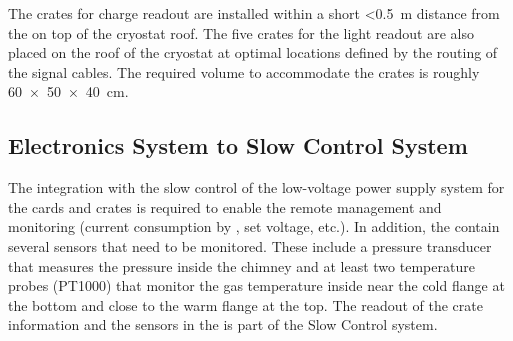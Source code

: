 The  crates for charge readout are installed within a short \SI{<0.5}{\meter} distance from the  on top of the cryostat roof. The five  crates for the light readout are also placed on the roof of the cryostat at optimal locations defined by the routing of the  signal cables. The required volume to accommodate the crates is roughly \SI[product-units=power]{60x50x40}{\cm}. 

\subsection{Electronics System to Slow Control System}
\label{ssec:dp-tpcelec-intfc-sc}

The integration with the slow control of the low-voltage power supply system for the  cards and  crates is required to enable the remote management and monitoring (current consumption by , set voltage, etc.). In addition, the  contain several sensors that need to be monitored. These include a pressure transducer that measures the pressure inside the chimney and at least two temperature probes (PT1000) that monitor the gas temperature inside near the cold flange at the bottom and close to the warm flange at the top. The readout of the  crate information and the sensors in the  is part of the Slow Control system.
